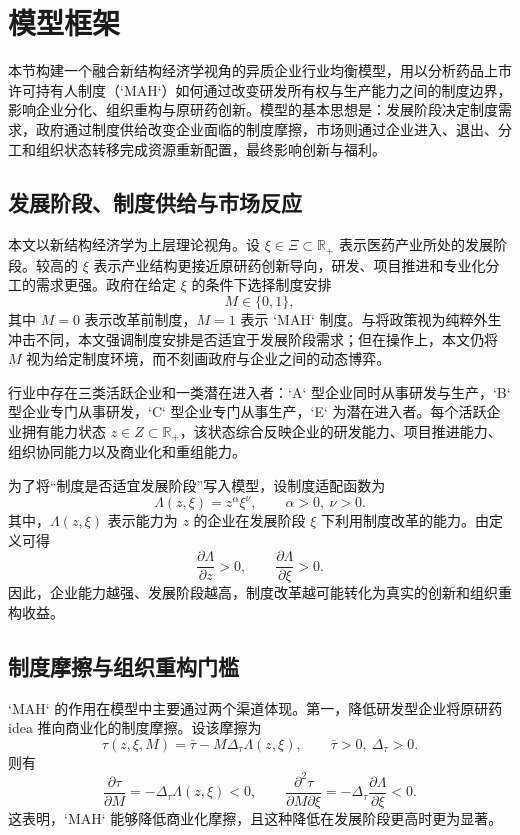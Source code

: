 \section{模型框架}

本节构建一个融合新结构经济学视角的异质企业行业均衡模型，用以分析药品上市许可持有人制度（`MAH`）如何通过改变研发所有权与生产能力之间的制度边界，影响企业分化、组织重构与原研药创新。模型的基本思想是：发展阶段决定制度需求，政府通过制度供给改变企业面临的制度摩擦，市场则通过企业进入、退出、分工和组织状态转移完成资源重新配置，最终影响创新与福利。

\subsection{发展阶段、制度供给与市场反应}

本文以新结构经济学为上层理论视角。设 $\xi \in \Xi \subset \mathbb{R}_{+}$ 表示医药产业所处的发展阶段。较高的 $\xi$ 表示产业结构更接近原研药创新导向，研发、项目推进和专业化分工的需求更强。政府在给定 $\xi$ 的条件下选择制度安排
\[
M \in \{0,1\},
\]
其中 $M=0$ 表示改革前制度，$M=1$ 表示 `MAH` 制度。与将政策视为纯粹外生冲击不同，本文强调制度安排是否适宜于发展阶段需求；但在操作上，本文仍将 $M$ 视为给定制度环境，而不刻画政府与企业之间的动态博弈。

行业中存在三类活跃企业和一类潜在进入者：`A` 型企业同时从事研发与生产，`B` 型企业专门从事研发，`C` 型企业专门从事生产，`E` 为潜在进入者。每个活跃企业拥有能力状态 $z \in Z \subset \mathbb{R}_{+}$，该状态综合反映企业的研发能力、项目推进能力、组织协同能力以及商业化和重组能力。

为了将“制度是否适宜发展阶段”写入模型，设制度适配函数为
\[
\Lambda(z,\xi)=z^{\alpha}\xi^{\nu}, \qquad \alpha>0,\ \nu>0.
\]
其中，$\Lambda(z,\xi)$ 表示能力为 $z$ 的企业在发展阶段 $\xi$ 下利用制度改革的能力。由定义可得
\[
\frac{\partial \Lambda}{\partial z}>0, \qquad \frac{\partial \Lambda}{\partial \xi}>0.
\]
因此，企业能力越强、发展阶段越高，制度改革越可能转化为真实的创新和组织重构收益。

\subsection{制度摩擦与组织重构门槛}

`MAH` 的作用在模型中主要通过两个渠道体现。第一，降低研发型企业将原研药 idea 推向商业化的制度摩擦。设该摩擦为
\[
\tau(z,\xi,M)=\bar{\tau}-M\Delta_{\tau}\Lambda(z,\xi), \qquad \bar{\tau}>0,\ \Delta_{\tau}>0.
\]
则有
\[
\frac{\partial \tau}{\partial M}=-\Delta_{\tau}\Lambda(z,\xi)<0,
\qquad
\frac{\partial^{2}\tau}{\partial M\partial \xi}
=-\Delta_{\tau}\frac{\partial \Lambda}{\partial \xi}<0.
\]
这表明，`MAH` 能够降低商业化摩擦，且这种降低在发展阶段更高时更为显著。

